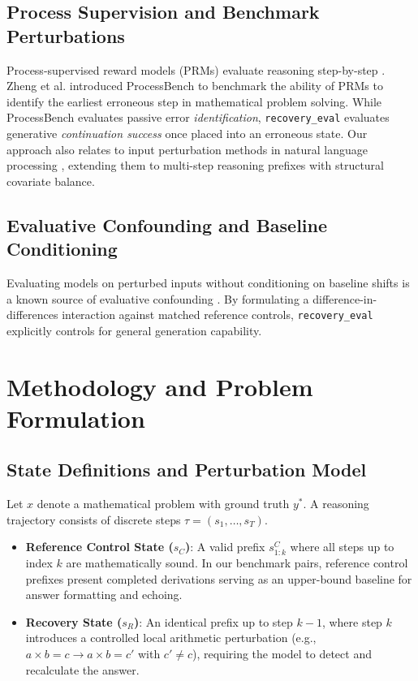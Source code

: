 \documentclass[conference]{IEEEtran}
\begin{document}
\subsection{Process Supervision and Benchmark Perturbations}
Process-supervised reward models (PRMs) evaluate reasoning step-by-step \cite{lightman2023process, wang2024mathshepherd}. Zheng et al. \cite{zheng2024processbench} introduced ProcessBench to benchmark the ability of PRMs to identify the earliest erroneous step in mathematical problem solving. While ProcessBench evaluates passive error \textit{identification}, \texttt{recovery\_eval} evaluates generative \textit{continuation success} once placed into an erroneous state. Our approach also relates to input perturbation methods in natural language processing \cite{ribeiro2020beyond, gardner2020evaluating}, extending them to multi-step reasoning prefixes with structural covariate balance.

\subsection{Evaluative Confounding and Baseline Conditioning}
Evaluating models on perturbed inputs without conditioning on baseline shifts is a known source of evaluative confounding \cite{madaan2023selfrefine, shinn2023reflexion}. By formulating a difference-in-differences interaction against matched reference controls, \texttt{recovery\_eval} explicitly controls for general generation capability.

\section{Methodology and Problem Formulation}

\subsection{State Definitions and Perturbation Model}
Let $x$ denote a mathematical problem with ground truth $y^*$. A reasoning trajectory consists of discrete steps $\tau = (s_1, \dots, s_T)$.
\begin{itemize}
    \item \textbf{Reference Control State ($s_C$)}: A valid prefix $s_{1:k}^C$ where all steps up to index $k$ are mathematically sound. In our benchmark pairs, reference control prefixes present completed derivations serving as an upper-bound baseline for answer formatting and echoing.
    \item \textbf{Recovery State ($s_R$)}: An identical prefix up to step $k-1$, where step $k$ introduces a controlled local arithmetic perturbation (e.g., $a \times b = c \rightarrow a \times b = c'$ with $c' \ne c$), requiring the model to detect and recalculate the answer.
\end{itemize}
\end{document}
